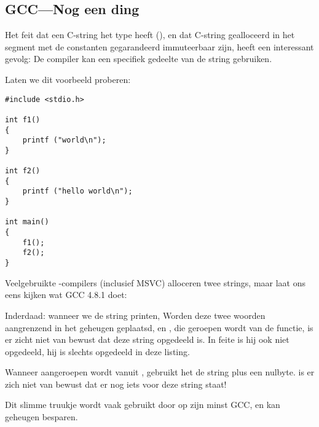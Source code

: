 \subsection{GCC---Nog een ding}
\label{use_parts_of_C_strings}

Het feit dat een  C-string het type  heeft (), 
en dat C-string gealloceerd in het segment met de constanten gegarandeerd immuteerbaar zijn, heeft een interessant gevolg:
De compiler kan een specifiek gedeelte van de string gebruiken.

Laten we dit voorbeeld proberen:

\begin{lstlisting}[style=customc]
#include <stdio.h>

int f1()
{
	printf ("world\n");
}

int f2()
{
	printf ("hello world\n");
}

int main()
{
	f1();
	f2();
}
\end{lstlisting}

Veelgebruikte \CCpp{}-compilers (inclusief MSVC) alloceren twee strings, maar laat ons eens kijken wat GCC 4.8.1 doet:



Inderdaad: wanneer we de  string printen, 
Worden deze twee woorden aangrenzend in het geheugen geplaatsd, en \puts, die geroepen wordt van de 
functie, is er zicht niet van bewust dat deze string opgedeeld is. 
In feite is hij ook niet opgedeeld, hij is slechts  opgedeeld in deze listing.

Wanneer \puts aangeroepen wordt vanuit , gebruikt het de  string plus een nulbyte. \puts is er zich niet van bewust dat er nog iets voor deze string staat!

Dit slimme truukje wordt vaak gebruikt door op zijn minst GCC, en kan geheugen besparen.

